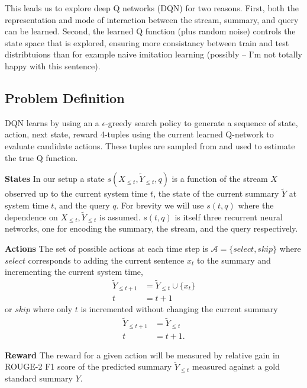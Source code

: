\documentclass[12pt]{article}
\begin{document}
  This leads us to explore deep Q networks (DQN) for two reasons. 
  First, both the 
  representation and mode of interaction between the stream, summary, and 
  query can be learned. 
  Second, the learned Q function (plus random noise) controls the state 
  space that is explored, ensuring more consistancy between train and test 
  distribtuions than for example naive imitation learning 
  (possibly -- I'm not totally happy with this sentence).

\subsection{Problem Definition}
   
    DQN learns by using an a $\epsilon$-greedy search policy to generate a 
    sequence of state, action, next state, reward 4-tuples using the current
    learned Q-network to evaluate candidate actions. These tuples are sampled
    from and used to estimate the true Q function.

    \textbf{States} 
    In our setup a state $s(X_{\le t},\tilde{Y}_{\le t}, q)$ is a function
    of the stream $X$ observed up to the current system time $t$, the state
    of the current summary $\tilde{Y}$ at system time $t$, and the query $q$.
    For brevity we will use $s(t,q)$ where the dependence on 
    $X_{\le t},\tilde{Y}_{\le t}$ is assumed.
    $s(t,q)$ is itself three recurrent neural networks, one for encoding 
    the summary, the stream, and the query respectively.

    \textbf{Actions} 
    The set of possible actions at each time step is 
    $\mathcal{A} = \{select, skip\}$ where $select$ corresponds to adding the 
    current sentence $x_t$ to the summary and incrementing the current system
    time, 
    \begin{align*}
        \tilde{Y}_{\le t + 1} &= \tilde{Y}_{\le t} \cup \{ x_t \} \\
        t &= t + 1    
    \end{align*}
    or $skip$ where only $t$ is incremented without changing the current 
    summary
    \begin{align*}
        \tilde{Y}_{\le t + 1} &= \tilde{Y}_{\le t}  \\
        t &= t + 1.
    \end{align*}


    \textbf{Reward} 
    The reward for a given action will be measured by relative gain in 
    ROUGE-2 F1 score of the predicted summary $\tilde{Y}_{\le t}$ measured
    against a gold standard summary $Y$.
\end{document}
